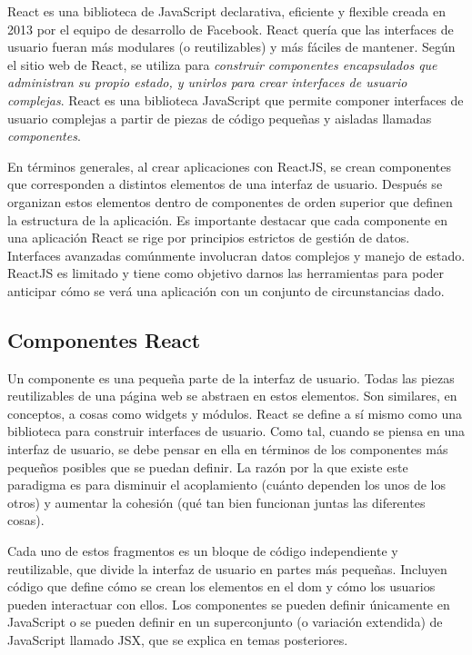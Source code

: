 React es una biblioteca de JavaScript declarativa, eficiente y flexible creada en 2013 por el equipo de desarrollo de Facebook. React quería que las interfaces de usuario fueran más modulares (o reutilizables) y más fáciles de mantener. Según el sitio web de React, se utiliza para \textit{construir componentes encapsulados que administran su propio estado, y unirlos para crear interfaces de usuario complejas}. React es una biblioteca JavaScript que permite componer interfaces de usuario complejas a partir de piezas de código pequeñas y aisladas llamadas \textit{componentes}.
\vspace{0.8cm}

En términos generales, al crear aplicaciones con ReactJS, se crean componentes que corresponden a distintos elementos de una interfaz de usuario. Después se organizan estos elementos dentro de componentes de orden superior que definen la estructura de la aplicación. Es importante destacar que cada componente en una aplicación React se rige por principios estrictos de gestión de datos. Interfaces avanzadas comúnmente involucran datos complejos y manejo de estado. ReactJS es limitado y tiene como objetivo darnos las herramientas para poder anticipar cómo se verá una aplicación con un conjunto de circunstancias dado.

\subsection{Componentes React}
Un componente es una pequeña parte de la interfaz de usuario. Todas las piezas reutilizables de una página web se abstraen en estos elementos. Son similares, en conceptos, a cosas como \glspl{widget} y módulos. React se define a sí mismo como una biblioteca para construir interfaces de usuario. Como tal, cuando se piensa en una interfaz de usuario, se debe pensar en ella en términos de los componentes más pequeños posibles que se puedan definir. La razón por la que existe este paradigma es para disminuir el acoplamiento (cuánto dependen los unos de los otros) y aumentar la cohesión (qué tan bien funcionan juntas las diferentes cosas).
\vspace{0.8cm}

Cada uno de estos fragmentos es un bloque de código independiente y reutilizable, que divide la interfaz de usuario en partes más pequeñas. Incluyen código que define cómo se crean los elementos en el \acrshort{dom} y cómo los usuarios pueden interactuar con ellos. Los componentes se pueden definir únicamente en JavaScript o se pueden definir en un superconjunto (o variación extendida) de JavaScript llamado JSX, que se explica en temas posteriores.
\vspace{0.8cm}

